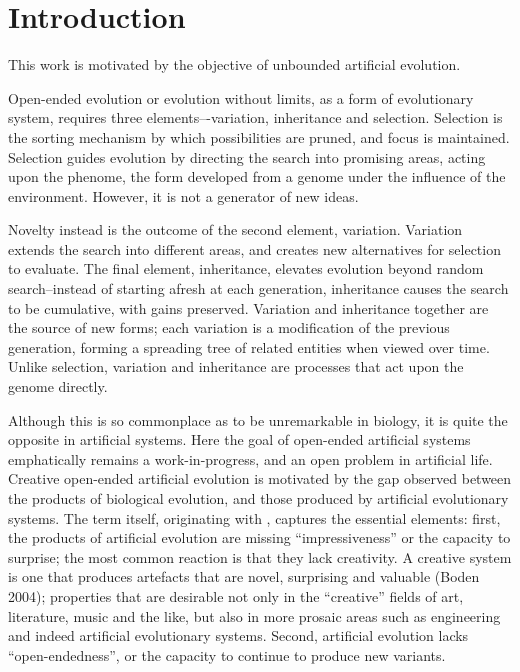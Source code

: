 \chapter{Introduction}\label{introduction}

This work is motivated by the objective of unbounded artificial evolution.

Open-ended evolution or evolution without limits, as a form of evolutionary system, requires three elements–-variation, inheritance and selection. Selection is the sorting mechanism by which possibilities are pruned, and focus is maintained. Selection guides evolution by directing the search into promising areas, acting upon the phenome, the form developed from a genome under the influence of the environment. However, it is not a generator of new ideas.

Novelty instead is the outcome of the second element, variation. Variation extends the search into different areas, and creates new alternatives for selection to evaluate. The final element, inheritance, elevates evolution beyond random search–instead of starting afresh at each generation, inheritance causes the search to be cumulative, with gains preserved. Variation and inheritance together are the source of new forms; each variation is a modification of the previous generation, forming a spreading tree of related entities when viewed over time. Unlike selection, variation and inheritance are processes that act upon the genome directly.

Although this is so commonplace as to be unremarkable in biology, it is quite the opposite in artificial systems. Here the goal of open-ended artificial systems emphatically remains a work-in-progress, and an open problem in artificial life. Creative open-ended artificial evolution is motivated by the gap observed between the products of biological evolution, and those produced by artificial evolutionary systems. The term itself, originating with \textcite{Taylor2001}, captures the essential elements: first, the products of artificial evolution are missing “impressiveness” or the capacity to surprise; the most common reaction is that they lack creativity. A creative system is one that produces artefacts that are novel, surprising and valuable (Boden 2004); properties that are desirable not only in the “creative” fields of art, literature, music and the like, but also in more prosaic areas such as engineering and indeed artificial evolutionary systems. Second, artificial evolution lacks “open-endedness”, or the capacity to continue to produce new variants. 

